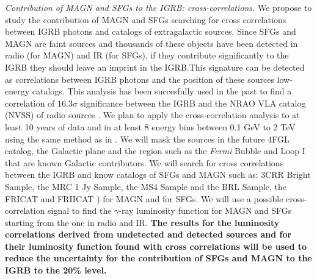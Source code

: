 \documentclass[12 pt]{article}
\begin{document}




{\it Contribution of MAGN and SFGs to the IGRB: cross-correlations.} 
We propose to study the contribution of MAGN and SFGs searching for cross correlations between IGRB photons and catalogs of extragalactic sources.
Since SFGs and MAGN are faint sources and thousands of these objects have been detected in radio (for MAGN) and IR (for SFGs), if they contribute significantly to the IGRB they should leave an imprint in the IGRB.This signature can be detected as correlations between IGRB photons and the position of these sources low-energy catalogs.
This analysis has been succesfully used in the past to find a correlation of $16.3\sigma$ significance between the IGRB and the NRAO VLA catalog (NVSS) of radio sources \cite{Cuoco:2017bpv}.
We plan to apply the cross-correlation analysis to at least 10 years of data and in at least 8 energy bins between 0.1 GeV to 2 TeV using the same method as in \cite{Cuoco:2017bpv}. We will mask the sources in the future 4FGL catalog, the Galactic plane and the region such as the {\it Fermi} Bubble and Loop I that are known Galactic contributors. 
We will search for cross correlations between the IGRB and know catalogs of SFGs and MAGN such as: 3CRR Bright Sample, the MRC 1 Jy Sample, the MS4 Sample and the BRL Sample, the FRICAT \cite{Capetti:2016srb} and FRIICAT \cite{Capetti:2017fjb}) for MAGN and \cite{Sanders:2003ms,2004ApJ...606..271G} for SFGs.
We will use a possible cross-correlation signal to find the $\gamma$-ray luminosity function for MAGN and SFGs starting from the one in radio and IR.
{\bf The results for the luminosity correlations derived from undetected and detected sources and for their luminosity function found with cross correlations will be used to reduce the uncertainty for the contribution of SFGs and MAGN to the IGRB to the 20\% level.}
\end{document}
